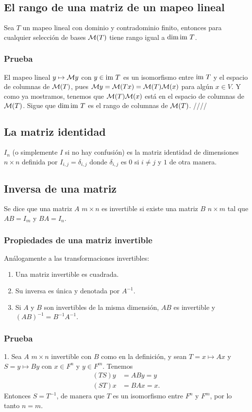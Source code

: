 \documentclass{article}
\begin{document}
\subsection{El rango de una matriz de un mapeo lineal}
Sea $T$ un mapeo lineal con dominio y contradominio finito,
entonces para cualquier selección de bases $\mathcal{M}(T)$ tiene rango
igual a $\dim\text{im } T$.
\subsubsection*{Prueba}
El mapeo lineal $y \mapsto \mathcal{M} y$ con $y\in\text{im } T$ es un isomorfismo
entre $\text{im } T$ y el espacio de columnas de $\mathcal{M}(T)$, pues
$\mathcal{M} y=\mathcal{M}(Tx) = \mathcal{M}(T)\mathcal{M}(x)$ para algún $x\in V$. Y como ya mostramos,
tenemos que $\mathcal{M}(T)\mathcal{M}(x)$ está en el espacio de columnas de $\mathcal{M}(T)$.
Sigue que $\dim\text{im } T$ es el rango de columnas de $\mathcal{M}(T)$.
\hfill ////

\subsection{La matriz identidad}
$I_n$ (o simplemente $I$ si no hay confusión) es la matriz identidad
de dimensiones $n\times n$ definida por $I_{i,j}=\delta_{i,j}$
donde $\delta_{i,j}$ es $0$ si $i\neq j$ y $1$ de otra manera.

\subsection{Inversa de una matriz}
Se dice que una matriz $A$ $m\times n$ es invertible si
existe una matriz $B$ $n\times m$ tal que $AB=I_m$ y
$BA=I_n$.

\subsubsection{Propiedades de una matriz invertible}
Análogamente a las transformaciones invertibles:
\begin{enumerate}
    \item Una matriz invertible es cuadrada.
    \item Su inversa es única y denotada por $A^{-1}$.
    \item Si $A$ y $B$ son invertibles de la misma dimensión,
    $AB$ es invertible y $(AB)^{-1}=B^{-1}A^{-1}$.
\end{enumerate}
\subsubsection*{Prueba}
1. Sea $A$ $m\times n$ invertible con $B$ como en la definición, y sean
$T= x\mapsto Ax$ y $S= y\mapsto By$ con $x\in F^n$ y $y\in F^m$.
Tenemos
\begin{align*}
    (TS)y &= ABy = y\\
    (ST)x &= BAx = x.
\end{align*}
Entonces $S=T^{-1}$, de manera que $T$ es un isomorfismo entre
$F^n$ y $F^m$, por lo tanto $n=m$.
\end{document}

